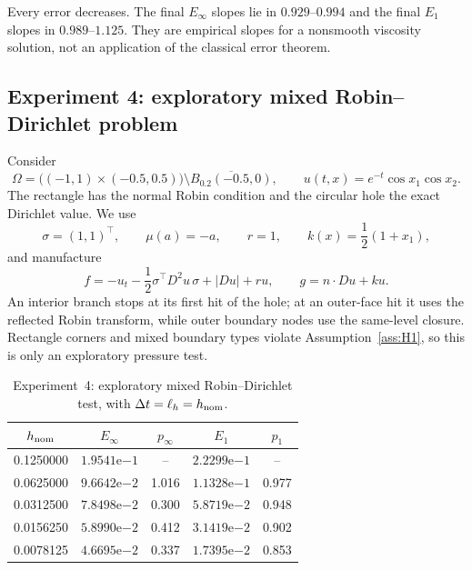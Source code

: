 \documentclass[11pt]{article}
\theoremstyle{definition}
\theoremstyle{remark}
\begin{document}
\FloatBarrier

Every error decreases.  The final $E_\infty$ slopes lie in
$0.929$--$0.994$ and the final $E_1$ slopes in $0.989$--$1.125$.
They are empirical slopes for a nonsmooth viscosity solution, not an
application of the classical error theorem.

\FloatBarrier

\subsection{Experiment 4: exploratory mixed Robin--Dirichlet problem}
\label{sec:mixed-test}

Consider
\[
 \Omega=\bigl((-1,1)\times(-0.5,0.5)\bigr)
 \setminus\overline{B_{0.2}(-0.5,0)},\qquad
 u(t,x)=e^{-t}\cos x_1\cos x_2.
\]
The rectangle has the normal Robin condition and the circular hole the exact
Dirichlet value.  We use
\[
 \sigma=(1,1)^\top,\qquad \mu(a)=-a,\qquad r=1,\qquad
 k(x)=\frac12(1+x_1),
\]
and manufacture
\begin{equation}
 f=-u_t-\frac12\sigma^\top D^2u\,\sigma+|Du|+ru,
 \qquad g=n\cdot Du+ku.
 \label{eq:experiment5-pde}
\end{equation}
An interior branch stops at its first hit of the hole; at an outer-face hit it
uses the reflected Robin transform, while outer boundary nodes use the
same-level closure.  Rectangle corners and mixed boundary types violate
Assumption~\ref{ass:H1}, so this is only an exploratory pressure test.

\begin{table}[htbp]
 \centering
 \small
 \setlength{\tabcolsep}{7pt}
 \renewcommand{\arraystretch}{0.96}
 \caption{Experiment~4: exploratory mixed Robin--Dirichlet test, with
 $\Delta t=\ell_h=h_{\rm nom}$.}
 \label{tab:ex4-mixed}
 \begin{tabular}{ccccc}
  \toprule
  $h_{\rm nom}$ & $E_\infty$ & $p_\infty$ & $E_1$ & $p_1$\\
  \midrule
  0.1250000 & $1.9541\mathrm e{-1}$ & -- & $2.2299\mathrm e{-1}$ & --\\
  0.0625000 & $9.6642\mathrm e{-2}$ & 1.016 & $1.1328\mathrm e{-1}$ & 0.977\\
  0.0312500 & $7.8498\mathrm e{-2}$ & 0.300 & $5.8719\mathrm e{-2}$ & 0.948\\
  0.0156250 & $5.8990\mathrm e{-2}$ & 0.412 & $3.1419\mathrm e{-2}$ & 0.902\\
  0.0078125 & $4.6695\mathrm e{-2}$ & 0.337 & $1.7395\mathrm e{-2}$ & 0.853\\
  \bottomrule
 \end{tabular}
\end{table}
\end{document}
